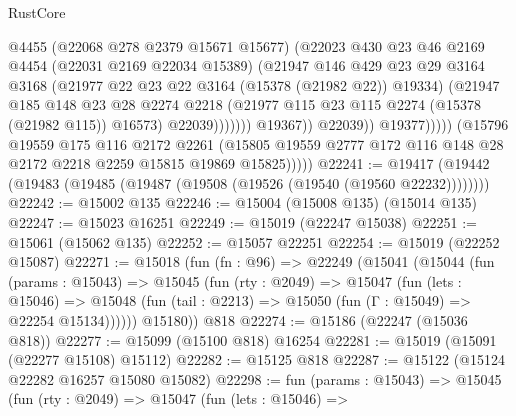 \begin{lexlean}{RustCore}
\begin{coremodule}
                                    @4455
                                    (@22068 @278 @2379 @15671 @15677)
                                    (@22023
                                      @430
                                      @23
                                      @46
                                      @2169
                                      @4454
                                      (@22031 @2169 @22034 @15389)
                                      (@21947
                                        @146
                                        @429
                                        @23
                                        @29
                                        @3164
                                        @3168
                                        (@21977 @22 @23 @22 @3164 (@15378 (@21982 @22)) @19334)
                                        (@21947
                                          @185
                                          @148
                                          @23
                                          @28
                                          @2274
                                          @2218
                                          (@21977 @115 @23 @115 @2274 (@15378 (@21982 @115)) @16573)
                                          @22039)))))))
                            @19367))
                        @22039))
                    @19377)))))
          (@15796
            @19559
            @175
            @116
            @2172
            @2261
            (@15805 @19559 @2777 @172 @116 @148 @28 @2172 @2218 @2259 @15815 @19869 @15825)))))
@22241 := @19417 (@19442 (@19483 (@19485 (@19487 (@19508 (@19526 (@19540 (@19560 @22232))))))))
@22242 := @15002 @135
@22246 := @15004 (@15008 @135) (@15014 @135)
@22247 := @15023 @16251
@22249 := @15019 (@22247 @15038)
@22251 := @15061 (@15062 @135)
@22252 := @15057 @22251
@22254 := @15019 (@22252 @15087)
@22271 := @15018
    (fun (fn : @96) =>
    @22249
      (@15041
        (@15044
          (fun (params : @15043) =>
          @15045
            (fun (rty : @2049) =>
            @15047
              (fun (lets : @15046) =>
              @15048 (fun (tail : @2213) => @15050 (fun (Γ : @15049) => @22254 @15134))))))
        @15180))
    @818
@22274 := @15186 (@22247 (@15036 @818))
@22277 := @15099 (@15100 @818) @16254
@22281 := @15019 (@15091 (@22277 @15108) @15112)
@22282 := @15125 @818
@22287 := @15122 (@15124 @22282 @16257 @15080 @15082)
@22298 := fun (params : @15043) =>
  @15045
    (fun (rty : @2049) =>
    @15047
      (fun (lets : @15046) =>

\end{coremodule}
\end{lexlean}
